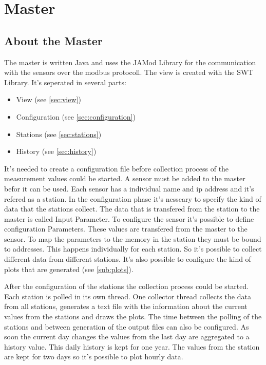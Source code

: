 
\chapter{Master}

\section{About the Master} %
\label{sec:about_the_master}

The master is written Java and uses the JAMod Library for the communication with the sensors over the modbus protocoll. The view is created with the SWT Library. 
It's seperated in several parts:
\begin{itemize}
	\item View (see \ref{sec:view})
	\item Configuration (see \ref{sec:configuration})
	\item Stations  (see \ref{sec:stations})
	\item History (see \ref{sec:history})
\end{itemize}

It's needed to create a configuration file before collection process of the measurement values could be started. A sensor must be added to the master befor it can be used. Each sensor has a individual name and ip address and it's refered as a station. In the configuration phase it's nesseary to specify the kind of data that the stations collect. The data that is transfered from the station to the master is called Input Parameter. To configure the sensor it's possible to define configuration Parameters. These values are transfered from the master to the sensor. To map the parameters to the memory in the station they must be bound to addresses. This happens individually for each station. So it's possible to collect different data from different stations. It's also possible to configure the kind of plots that are generated (see \ref{sub:plots}).

After the configuration of the stations the collection process could be started. Each station is polled in its own thread. One collector thread collects the data from all stations, generates a text file with the information about the current values from the stations and draws the plots. The time between the polling of the stations and between generation of the output files can also be configured. As soon the current day changes the values from the last day are aggregated to a history value. This daily history is kept for one year. The values from the station are kept for two days so it's possible to plot hourly data. 

